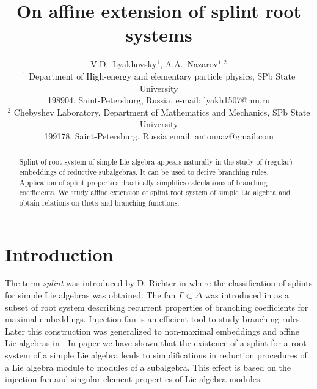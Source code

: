 \documentclass[12pt]{article}
\begin{document}
\title{On affine extension of splint root systems}



\author{V.D.~Lyakhovsky$^1$, A.A.~Nazarov$^{1,2}$ \\
  {\small $^1$ Department of High-energy and elementary particle physics, SPb State University}\\
  {\small 198904, Saint-Petersburg, Russia,}
  {\small e-mail: lyakh1507@nm.ru}\\
  {\small$^{2}$ Chebyshev Laboratory,}
  {\small Department of Mathematics and Mechanics, SPb State University}\\
  {\small 199178, Saint-Petersburg, Russia}
  {\small email: antonnaz@gmail.com}}
\date{}
\maketitle

\begin{abstract}
Splint of root system of simple Lie algebra appears naturally in
the study of (regular) embeddings of reductive subalgebras. It can
be used to derive branching rules. Application of
splint properties drastically simplifies calculations of
branching coefficients. We study affine extension of splint root system of simple Lie algebra and obtain relations on theta and branching functions.
\end{abstract}

\section{Introduction}
\label{sec:introduction}


The term {\it splint} was introduced by D. Richter in \cite{richter2008splints} where the
classification of splints for simple Lie algebras was obtained. The fan $\Gamma \subset \Delta$ was
introduced in \cite{lyakhovsky1996rra} as a subset of root system describing recurrent properties of
branching coefficients for maximal embeddings. Injection fan is an efficient tool to study branching
rules. Later this construction was generalized to non-maximal embeddings and affine Lie algebras in
\cite{2010arXiv1007.0318L, ilyin812pbc}. In paper \cite{2011arXiv1111.6787L} we have shown that the
existence of a splint for a root system of a simple Lie algebra leads to simplifications in
reduction procedures of a Lie algebra module to modules of a subalgebra. This effect is based on the
injection fan and singular element properties of Lie algebra modules.
\end{document}
